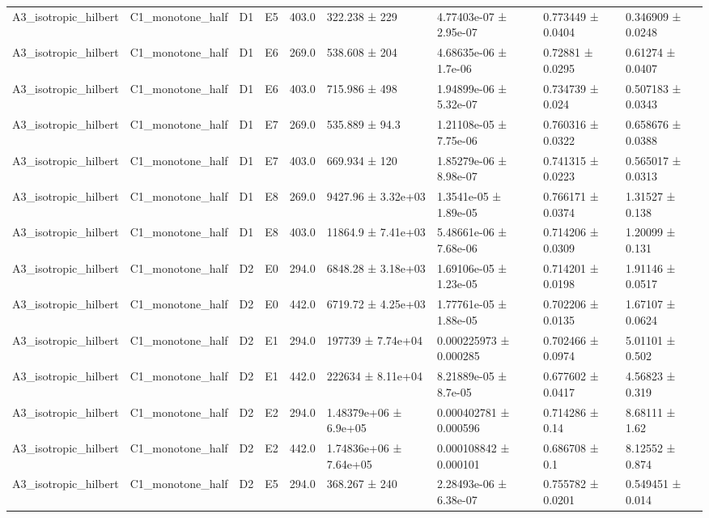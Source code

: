 \begin{table}
\begin{tabular}{lllllllll}
A3\_isotropic\_hilbert & C1\_monotone\_half & D1 & E5 & 403.0 & 322.238 ± 229 & 4.77403e-07 ± 2.95e-07 & 0.773449 ± 0.0404 & 0.346909 ± 0.0248 \\
A3\_isotropic\_hilbert & C1\_monotone\_half & D1 & E6 & 269.0 & 538.608 ± 204 & 4.68635e-06 ± 1.7e-06 & 0.72881 ± 0.0295 & 0.61274 ± 0.0407 \\
A3\_isotropic\_hilbert & C1\_monotone\_half & D1 & E6 & 403.0 & 715.986 ± 498 & 1.94899e-06 ± 5.32e-07 & 0.734739 ± 0.024 & 0.507183 ± 0.0343 \\
A3\_isotropic\_hilbert & C1\_monotone\_half & D1 & E7 & 269.0 & 535.889 ± 94.3 & 1.21108e-05 ± 7.75e-06 & 0.760316 ± 0.0322 & 0.658676 ± 0.0388 \\
A3\_isotropic\_hilbert & C1\_monotone\_half & D1 & E7 & 403.0 & 669.934 ± 120 & 1.85279e-06 ± 8.98e-07 & 0.741315 ± 0.0223 & 0.565017 ± 0.0313 \\
A3\_isotropic\_hilbert & C1\_monotone\_half & D1 & E8 & 269.0 & 9427.96 ± 3.32e+03 & 1.3541e-05 ± 1.89e-05 & 0.766171 ± 0.0374 & 1.31527 ± 0.138 \\
A3\_isotropic\_hilbert & C1\_monotone\_half & D1 & E8 & 403.0 & 11864.9 ± 7.41e+03 & 5.48661e-06 ± 7.68e-06 & 0.714206 ± 0.0309 & 1.20099 ± 0.131 \\
A3\_isotropic\_hilbert & C1\_monotone\_half & D2 & E0 & 294.0 & 6848.28 ± 3.18e+03 & 1.69106e-05 ± 1.23e-05 & 0.714201 ± 0.0198 & 1.91146 ± 0.0517 \\
A3\_isotropic\_hilbert & C1\_monotone\_half & D2 & E0 & 442.0 & 6719.72 ± 4.25e+03 & 1.77761e-05 ± 1.88e-05 & 0.702206 ± 0.0135 & 1.67107 ± 0.0624 \\
A3\_isotropic\_hilbert & C1\_monotone\_half & D2 & E1 & 294.0 & 197739 ± 7.74e+04 & 0.000225973 ± 0.000285 & 0.702466 ± 0.0974 & 5.01101 ± 0.502 \\
A3\_isotropic\_hilbert & C1\_monotone\_half & D2 & E1 & 442.0 & 222634 ± 8.11e+04 & 8.21889e-05 ± 8.7e-05 & 0.677602 ± 0.0417 & 4.56823 ± 0.319 \\
A3\_isotropic\_hilbert & C1\_monotone\_half & D2 & E2 & 294.0 & 1.48379e+06 ± 6.9e+05 & 0.000402781 ± 0.000596 & 0.714286 ± 0.14 & 8.68111 ± 1.62 \\
A3\_isotropic\_hilbert & C1\_monotone\_half & D2 & E2 & 442.0 & 1.74836e+06 ± 7.64e+05 & 0.000108842 ± 0.000101 & 0.686708 ± 0.1 & 8.12552 ± 0.874 \\
A3\_isotropic\_hilbert & C1\_monotone\_half & D2 & E5 & 294.0 & 368.267 ± 240 & 2.28493e-06 ± 6.38e-07 & 0.755782 ± 0.0201 & 0.549451 ± 0.014 \\

\end{tabular}
\end{table}

